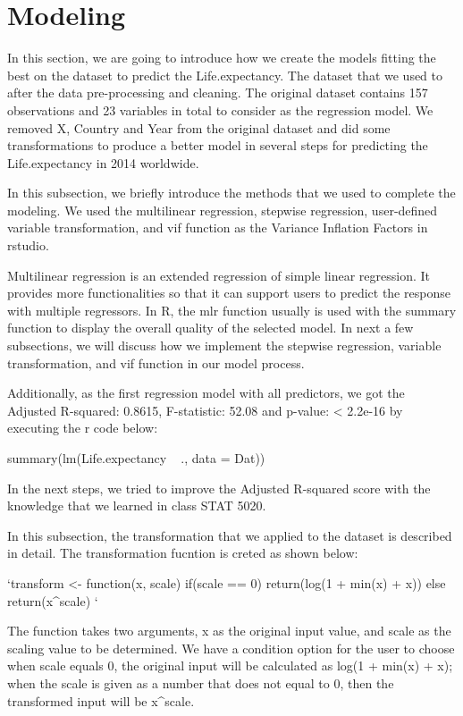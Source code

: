 \section{Modeling}
\label{sec:modeling}

In this section, we are going to introduce how we create the models fitting the best on the dataset to predict the Life.expectancy. The dataset that we used to after the data pre-processing and cleaning. The original dataset contains 157 observations and 23 variables in total to consider as the regression model. We removed X, Country and Year from the original dataset and did some transformations to produce a better model in several steps for predicting the Life.expectancy in 2014 worldwide.


In this subsection, we briefly introduce the methods that we used to complete the modeling. We used the multilinear regression, stepwise regression, user-defined variable transformation, and vif function as the Variance Inflation Factors in rstudio.

Multilinear regression is an extended regression of simple linear regression. It provides more functionalities so that it can support users to predict the response with multiple regressors. In R, the mlr function usually is used with the summary function to display the overall quality of the selected model. In next a few subsections, we will discuss how we implement the stepwise regression, variable transformation, and vif function in our model process.

Additionally, as the first regression model with all predictors, we got the Adjusted R-squared: 0.8615, F-statistic: 52.08 and p-value: < 2.2e-16 by executing the r code below:

summary(lm(Life.expectancy ~ ., data = Dat))

In the next steps, we tried to improve the Adjusted R-squared score with the knowledge that we learned in class STAT 5020.


In this subsection, the transformation that we applied to the dataset is described in detail. The transformation fucntion is creted as shown below:

`transform <- function(x, scale) {
  if(scale == 0) return(log(1 + min(x) + x))
  else return(x^scale)
}`

The function takes two arguments, x as the original input value, and scale as the scaling value to be determined. We have a condition option for the user to choose when scale equals 0, the original input will be calculated as log(1 + min(x) + x); when the scale is given as a number that does not equal to 0, then the transformed input will be x^scale.

